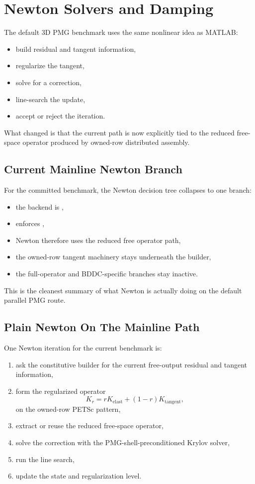 \chapter{Newton Solvers and Damping}

The default 3D PMG benchmark uses the same nonlinear idea as MATLAB:
\begin{itemize}
\item build residual and tangent information,
\item regularize the tangent,
\item solve for a correction,
\item line-search the update,
\item accept or reject the iteration.
\end{itemize}

What changed is that the current path is now explicitly tied to the reduced
free-space operator produced by owned-row distributed assembly.

\section{Current Mainline Newton Branch}

For the committed benchmark, the Newton decision tree collapses to one branch:
\begin{itemize}
\item the backend is ,
\item {} enforces
,
\item Newton therefore uses the reduced free operator path,
\item the owned-row tangent machinery stays underneath the builder,
\item the full-operator and BDDC-specific branches stay inactive.
\end{itemize}

This is the cleanest summary of what Newton is actually doing on the default
parallel PMG route.

\section{Plain Newton On The Mainline Path}

One Newton iteration for the current benchmark is:
\begin{enumerate}
\item ask the constitutive builder for the current free-output residual and
tangent information,
\item form the regularized operator
\[
K_r = r K_{\mathrm{elast}} + (1-r) K_{\mathrm{tangent}},
\]
on the owned-row PETSc pattern,
\item extract or reuse the reduced free-space operator,
\item solve the correction with the PMG-shell-preconditioned Krylov solver,
\item run the line search,
\item update the state and regularization level.
\end{enumerate}

